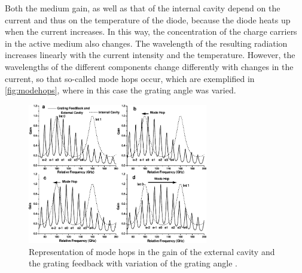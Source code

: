 Both the medium gain,
as well as that of the internal cavity depend on the current and thus on the temperature of the diode,
because the diode heats up when the current increases.
In this way, the concentration of the charge carriers in the active medium also changes.
The wavelength of the resulting radiation increases linearly with the current intensity and the temperature.
However, the wavelengths of the different components change differently with changes in the current,
so that so-called mode hops occur,
which are exemplified in \autoref{fig:modehops},
where in this case the grating angle was varied.
\begin{figure}
    \centering
    \includegraphics[width=0.7\textwidth]{content/img/p13_Fig9.pdf}
    \caption{Representation of mode hops in the gain of the external cavity and the grating feedback with variation of the grating angle \cite{versuchsanleitung}.}
    \label{fig:modehops}
\end{figure}

